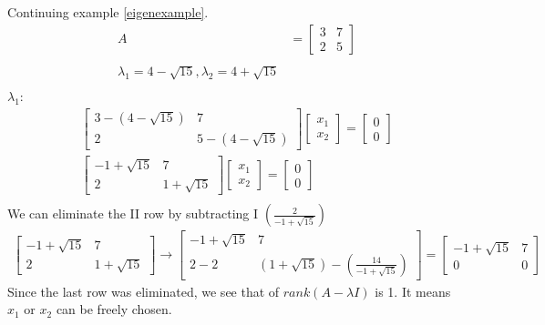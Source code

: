 \begin{example}
    Continuing  example \ref{eigenexample}.
    \begin{align*}
        A & = \begin{bmatrix}
            3 & 7 \\ 2 & 5
        \end{bmatrix}                      \\                                                                                                                                                  \\
        \lambda_1 = 4 - \sqrt{15},  \lambda_2 = 4 + \sqrt{15} \\
    \end{align*}
    \(\lambda_1\):
    \begin{align*}
        \begin{bmatrix}
            3 - (4 - \sqrt{15}) & 7 \\ 2 & 5 - ( 4 - \sqrt{15})
        \end{bmatrix}
        \begin{bmatrix}
            x_1 \\ x_2
        \end{bmatrix}= \begin{bmatrix}
            0 \\ 0
        \end{bmatrix}                           \\
        \begin{bmatrix}
            -1 + \sqrt{15} & 7 \\ 2 & 1 + \sqrt{15}
        \end{bmatrix}\begin{bmatrix}
            x_1 \\ x_2
        \end{bmatrix}= \begin{bmatrix}
            0 \\ 0
        \end{bmatrix} \\
    \end{align*}
    We can eliminate the II row by subtracting I $ \left( \frac{2}{-1 + \sqrt{15}} \right) $ \\
    \begin{align*}
        \begin{bmatrix}
            -1 + \sqrt{15} & 7 \\ 2 & 1 + \sqrt{15}
        \end{bmatrix} \rightarrow
        \begin{bmatrix}
            -1 + \sqrt{15} & 7 \\ 2 - 2 & (1 + \sqrt{15})-  \left(\frac{14}{-1 + \sqrt{15}} \right)
        \end{bmatrix} = \begin{bmatrix}
            -1 + \sqrt{15} & 7 \\ 0 & 0
        \end{bmatrix}
    \end{align*}
    Since the last row was eliminated, we see that  of $rank(A- \lambda I)$ is 1. It means $x_1$ or $x_2$ can be freely chosen.


\end{example}
